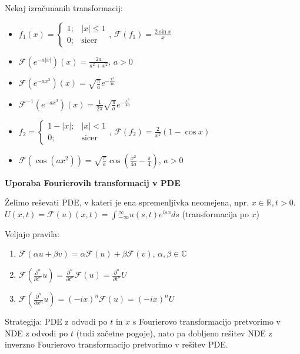 \documentclass[10pt,a4paper]{amsart}
\theoremstyle{definition} %
\theoremstyle{plain} %
\let\oldint\int
\renewcommand{\int}{\oldint \!}
\newcommand{\R}{\mathbb R}
\newcommand{\C}{\mathbb C}
\newcommand{\F}{\mathcal{F}}
\begin{document}
Nekaj izračunanih transformacij:
\begin{itemize}

\item $f_1(x) = \begin{cases} 1;& |x| \leq 1 \\ 0; &\text{sicer} \end{cases}$, $\F(f_1) = \frac{2\sin x}{x}$

\item $\F (e^{-a|x|})(x) = \frac{2a}{a^2+x^2}$, $a>0$

\item $\F (e^{-ax^2})(x) = \sqrt{\frac{\pi}{a}}e^{-\frac{x^2}{4a}}$

\item $\F^{-1} (e^{-ax^2})(x) = \frac{1}{2\pi}\sqrt{\frac{\pi}{a}}e^{-\frac{x^2}{4a}}$

\item $f_2 = \begin{cases} 1-|x|;& |x|< 1 \\  0; & \text{sicer} \end{cases}$, $\F(f_2) = \frac{2}{x^2}(1-\cos x)$

\item $\F (\cos (ax^2) ) = \sqrt{\frac{\pi}{a}} \cos (\frac{x^2}{4a}-\frac{ \pi}{4} )$, $a > 0$

\end{itemize}

\textbf{Uporaba Fourierovih transformacij v PDE}

Želimo reševati PDE, v kateri je ena spremenljivka neomejena, npr. $x \in \R, t > 0$.
$U(x,t) =  \F(u)(x,t) = \int_{-\infty}^\infty u(s,t)e^{isx}ds$ (transformacija po $x$)

Veljajo pravila:
\begin{enumerate}

\item $\F(\alpha u + \beta v) = \alpha \F(u) + \beta \F (v)$, $\alpha , \beta \in \C$

\item $\F(\frac{\partial^n}{\partial t^n} u) = \frac{\partial^n}{\partial t^n}\F(u) = \frac{\partial^n}{\partial t^n} U$

\item $\F(\frac{\partial^n}{\partial x^n}u) = (-ix)^n \F(u) = (-ix)^n U$

\end{enumerate}

Strategija: PDE z odvodi po $t$ in $x$ s Fourierovo transformacijo pretvorimo v NDE z odvodi po $t$ (tudi začetne pogoje), nato pa dobljeno rešitev NDE z inverzno Fourierovo transformacijo pretvorimo v rešitev PDE.
\end{document}
